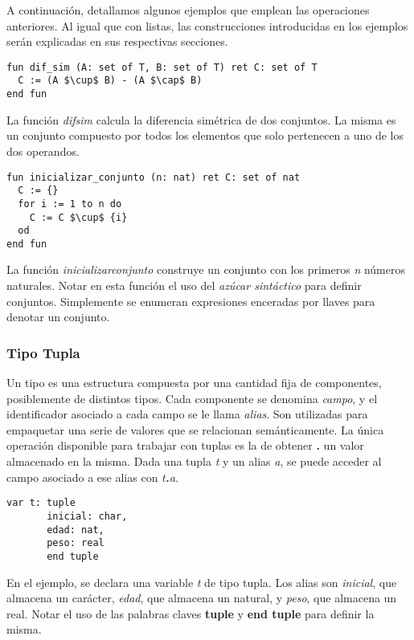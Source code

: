 \documentclass{article}
\begin{document}
A continuación, detallamos algunos ejemplos que emplean las operaciones anteriores.
Al igual que con listas, las construcciones introducidas en los ejemplos serán explicadas en sus respectivas secciones.

\begin{lstlisting}
fun dif_sim (A: set of T, B: set of T) ret C: set of T
  C := (A $\cup$ B) - (A $\cap$ B)
end fun
\end{lstlisting}

La función \textit{dif\gbajo sim} calcula la diferencia simétrica de dos conjuntos.
La misma es un conjunto compuesto por todos los elementos que solo pertenecen a uno de los dos operandos. 

\begin{lstlisting}
fun inicializar_conjunto (n: nat) ret C: set of nat
  C := {}
  for i := 1 to n do
    C := C $\cup$ {i}
  od
end fun
\end{lstlisting}

La función \textit{inicializar\gbajo conjunto} construye un conjunto con los primeros \textit{n} números naturales.
Notar en esta función el uso del \textit{azúcar sintáctico} para definir conjuntos.
Simplemente se enumeran expresiones enceradas por llaves para denotar un conjunto.

\subsubsection{Tipo Tupla}

Un tipo  es una estructura compuesta por una cantidad fija de componentes, posiblemente de distintos tipos.
Cada componente se denomina \textit{campo}, y el identificador asociado a cada campo se le llama \textit{alias}.
Son utilizadas para empaquetar una serie de valores que se relacionan semánticamente.
La única operación disponible para trabajar con tuplas es la de obtener \textbf{.} un valor almacenado en la misma.
Dada una tupla \textit{t} y un alias \textit{a}, se puede acceder al campo asociado a ese alias con \textit{t\textbf{.}a}.

\begin{lstlisting}
var t: tuple
       inicial: char,
       edad: nat,
       peso: real
       end tuple
\end{lstlisting}

En el ejemplo, se declara una variable \textit{t} de tipo tupla.
Los alias son \textit{inicial}, que almacena un carácter, \textit{edad}, que almacena un natural, y \textit{peso}, que almacena un real.
Notar el uso de las palabras claves \textbf{tuple} y \textbf{end tuple} para definir la misma.
\end{document}
